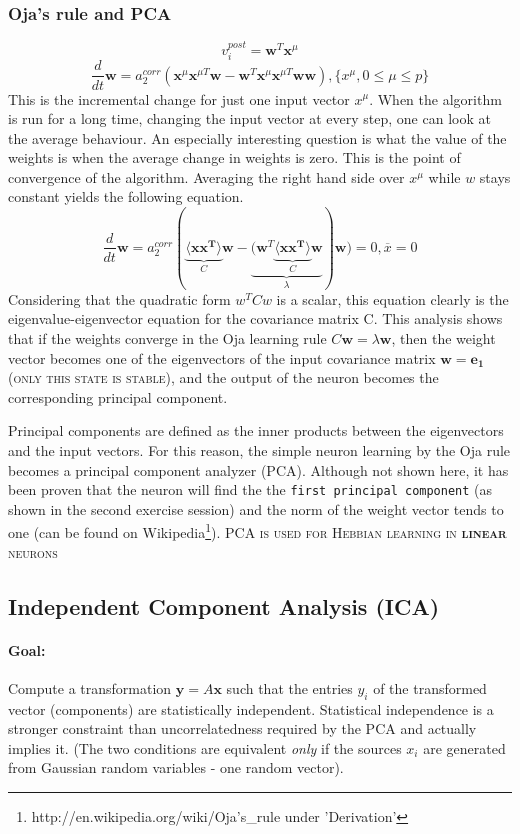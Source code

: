 \documentclass[11pt]{article}
\begin{document}
\subsubsection{Oja's rule and PCA}
\[
v_i^{post}=\mathbf{w}^T\mathbf{x}^\mu
\]
\[
\frac{d}{dt}\mathbf{w}=a_2^{corr}(\mathbf{x}^\mu \mathbf{x}^{\mu T}\mathbf{w}-\mathbf{w}^T\mathbf{x}^\mu \mathbf{x}^{\mu T}\mathbf{w}\mathbf{w}), \{x^\mu, 0 \leq \mu \leq p\}
\]
This is the incremental change for just one input vector $x^\mu$. When the algorithm is run for a long time, changing the input vector at every step, one can look at the average behaviour. An especially interesting question is what the value of the weights is when the average change in weights is zero. This is the point of convergence of the algorithm. Averaging the right hand side over $x^\mu$ while $w$ stays constant yields the following equation.
\[
\frac{d}{dt}\mathbf{w}=a_2^{corr}(\underbrace{\langle \mathbf{x}\mathbf{x^T} \rangle}_{C} \mathbf{w}-\underbrace{(\mathbf{w}^T\underbrace{\langle \mathbf{x}\mathbf{x^T} \rangle}_{C} \mathbf{w}}_{\lambda})\mathbf{w})=0, \overline{x}=0
\]
Considering that the quadratic form $w^TCw$ is a scalar, this equation clearly is the eigenvalue-eigenvector equation for the covariance matrix C. This analysis shows that if the weights converge in the Oja learning rule $C\mathbf{w}=\lambda\mathbf{w}$, then the weight vector becomes one of the eigenvectors of the input covariance matrix $\mathbf{w}=\mathbf{e_1}$ (\textsc{only this state is stable}), and the output of the neuron becomes the corresponding principal component. 

Principal components are defined as the inner products between the eigenvectors and the input vectors. For this reason, the simple neuron learning by the Oja rule becomes a principal component analyzer (PCA).
Although not shown here, it has been proven that the neuron will find the the \texttt{first principal component} (as shown in the second exercise session) and the norm of the weight vector tends to one (can be found on Wikipedia\footnote{http://en.wikipedia.org/wiki/Oja's\_rule under 'Derivation'}).
\textsc{PCA is used for Hebbian learning in \textbf{linear} neurons}

\subsection{Independent Component Analysis (ICA)}

\paragraph{Goal:} Compute a transformation $\mathbf{y}=A\mathbf{x}$ such that the entries $y_i$ of the transformed vector (components) are statistically independent. Statistical independence is a stronger constraint than uncorrelatedness required by the PCA and actually implies it. (The two conditions are equivalent \textit{only} if the sources $x_i$ are generated from Gaussian random variables - one random vector). 
\end{document}

